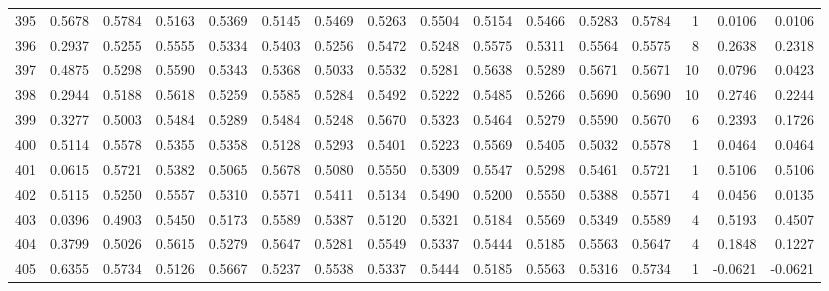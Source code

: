 \begin{tabular}{lrrrrrrrrrrrrrrr}
395 &      0.5678 &  0.5784 &  0.5163 &  0.5369 &  0.5145 &  0.5469 &  0.5263 &  0.5504 &  0.5154 &  0.5466 &   0.5283 &     0.5784 &      1 &                    0.0106 &                     0.0106 \\
396 &      0.2937 &  0.5255 &  0.5555 &  0.5334 &  0.5403 &  0.5256 &  0.5472 &  0.5248 &  0.5575 &  0.5311 &   0.5564 &     0.5575 &      8 &                    0.2638 &                     0.2318 \\
397 &      0.4875 &  0.5298 &  0.5590 &  0.5343 &  0.5368 &  0.5033 &  0.5532 &  0.5281 &  0.5638 &  0.5289 &   0.5671 &     0.5671 &     10 &                    0.0796 &                     0.0423 \\
398 &      0.2944 &  0.5188 &  0.5618 &  0.5259 &  0.5585 &  0.5284 &  0.5492 &  0.5222 &  0.5485 &  0.5266 &   0.5690 &     0.5690 &     10 &                    0.2746 &                     0.2244 \\
399 &      0.3277 &  0.5003 &  0.5484 &  0.5289 &  0.5484 &  0.5248 &  0.5670 &  0.5323 &  0.5464 &  0.5279 &   0.5590 &     0.5670 &      6 &                    0.2393 &                     0.1726 \\
400 &      0.5114 &  0.5578 &  0.5355 &  0.5358 &  0.5128 &  0.5293 &  0.5401 &  0.5223 &  0.5569 &  0.5405 &   0.5032 &     0.5578 &      1 &                    0.0464 &                     0.0464 \\
401 &      0.0615 &  0.5721 &  0.5382 &  0.5065 &  0.5678 &  0.5080 &  0.5550 &  0.5309 &  0.5547 &  0.5298 &   0.5461 &     0.5721 &      1 &                    0.5106 &                     0.5106 \\
402 &      0.5115 &  0.5250 &  0.5557 &  0.5310 &  0.5571 &  0.5411 &  0.5134 &  0.5490 &  0.5200 &  0.5550 &   0.5388 &     0.5571 &      4 &                    0.0456 &                     0.0135 \\
403 &      0.0396 &  0.4903 &  0.5450 &  0.5173 &  0.5589 &  0.5387 &  0.5120 &  0.5321 &  0.5184 &  0.5569 &   0.5349 &     0.5589 &      4 &                    0.5193 &                     0.4507 \\
404 &      0.3799 &  0.5026 &  0.5615 &  0.5279 &  0.5647 &  0.5281 &  0.5549 &  0.5337 &  0.5444 &  0.5185 &   0.5563 &     0.5647 &      4 &                    0.1848 &                     0.1227 \\
405 &      0.6355 &  0.5734 &  0.5126 &  0.5667 &  0.5237 &  0.5538 &  0.5337 &  0.5444 &  0.5185 &  0.5563 &   0.5316 &     0.5734 &      1 &                   -0.0621 &                    -0.0621 \\

\end{tabular}
